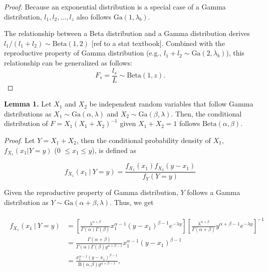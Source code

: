 \documentclass[11pt, class=article, crop=false]{standalone}
\begin{document}
\begin{proof}
Because an exponential distribution is a special case of a Gamma distribution, $l_1, l_2, \ldots, l_z$  also follows $\mbox{Ga}(1, \lambda_b)$.

The relationship between a Beta distribution and a Gamma distribution derives $l_1/(l_1+l_2) \sim \mbox{Beta}(1, 2)$ [ref to a stat textbook]. Combined with the reproductive property of  Gamma distribution (e.g., $l_1+l_2 \sim \mbox{Ga}(2, \lambda_b)$), this relationship can be generalized as follows:
\begin{equation}
F_s=\frac{l_s}{L} \sim \mbox{Beta} (1, z).
\end{equation}
\end{proof}
\textbf{Lemma 1.}
Let $X_1$ and $X_2$ be independent random variables that follow Gamma distributions as $X_1 \sim \mbox{Ga}(\alpha, \lambda)$ and $X_2 \sim \mbox{Ga}(\beta, \lambda)$.
Then, the conditional distribution of $F = X_1(X_1 + X_2)^{-1}$ given $X_1 + X_2 = 1$ follows $\mbox{Beta}(\alpha, \beta)$.

\textit{Proof}.
Let $Y = X_1 + X_2$, then the conditional probability density of $X_1$, $f_{X_1}(x_1 | Y = y)$ (0 $\le x_1 \le y$), is defined as

\begin{equation}
    f_{X_1}(x_1~|~Y = y) = \frac{f_{X_1}(x_1) f_{X_2}(y - x_1)}{f_{Y}(Y = y)}
\end{equation}

Given the reproductive property of Gamma distribution, $Y$ follows a Gamma distribution as $Y \sim \mbox{Ga}(\alpha + \beta, \lambda)$.
Thus, we get

\begin{align}
    \begin{split}
        f_{X_1}(x_1~|~Y = y)
        &= 
        \left[
            \frac{\lambda^{\alpha + \beta}}{\Gamma(\alpha) \Gamma(\beta)}x_1^{\alpha - 1} (y - x_1)^{\beta - 1} e^{-\lambda y}
        \right]
        \left[
            \frac{\lambda^{\alpha + \beta}}{\Gamma(\alpha + \beta)} y^{\alpha + \beta - 1} e^{-\lambda y}
        \right]^{-1}\\
        &= \frac{\Gamma(\alpha + \beta)}{\Gamma(\alpha) \Gamma(\beta) y^{\alpha + \beta - 1}} x_1^{\alpha - 1} (y - x_1)^{\beta - 1}\\
        &= \frac{x_1^{\alpha - 1} (y - x_1)^{\beta - 1}}{\mbox{B}(\alpha, \beta) y^{\alpha + \beta - 1}},
    \end{split}
    \label{eq:dbeta}
\end{align}
\end{document}
